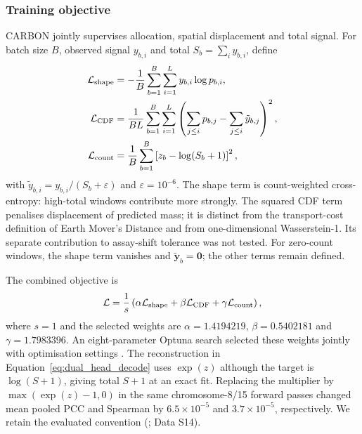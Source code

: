 \subsubsection{Training objective}\label{subsec:loss}

CARBON jointly supervises allocation, spatial displacement and total signal. For batch size $B$, observed signal $y_{b,i}$ and total $S_b=\sum_i y_{b,i}$, define
\begin{align}
\mathcal L_{\rm shape}
&=-\frac1B\sum_{b=1}^{B}\sum_{i=1}^{L}y_{b,i}\log p_{b,i},
\label{eq:shape_loss}\\
\mathcal L_{\rm CDF}
&=\frac1{BL}\sum_{b=1}^{B}\sum_{i=1}^{L}
\left(\sum_{j\leq i}p_{b,j}-\sum_{j\leq i}\tilde y_{b,j}\right)^2,
\label{eq:cdf_loss}\\
\mathcal L_{\rm count}
&=\frac1B\sum_{b=1}^{B}\left[z_b-\log(S_b+1)\right]^2,
\label{eq:main_count_loss}
\end{align}
with $\tilde y_{b,i}=y_{b,i}/(S_b+\varepsilon)$ and $\varepsilon=10^{-6}$. The shape term is count-weighted cross-entropy: high-total windows contribute more strongly. The squared CDF term penalises displacement of predicted mass; it is distinct from the transport-cost definition of Earth Mover's Distance \citep{rubner2000emd} and from one-dimensional Wasserstein-1. Its separate contribution to assay-shift tolerance was not tested. For zero-count windows, the shape term vanishes and $\tilde{\mathbf y}_b=\mathbf0$; the other terms remain defined.

The combined objective is
\begin{equation}
\mathcal L=\frac1s
\left(\alpha\mathcal L_{\rm shape}+
\beta\mathcal L_{\rm CDF}+\gamma\mathcal L_{\rm count}\right),
\label{eq:total_loss}
\end{equation}
where $s=1$ and the selected weights are $\alpha=1.4194219$, $\beta=0.5402181$ and $\gamma=1.7983396$. An eight-parameter Optuna search selected these weights jointly with optimisation settings \citep{akiba2019optuna}. The reconstruction in Equation~\ref{eq:dual_head_decode} uses $\exp(z)$ although the target is $\log(S+1)$, giving total $S+1$ at an exact fit. Replacing the multiplier by $\max(\exp(z)-1,0)$ in the same chromosome-8/15 forward passes changed mean pooled PCC and Spearman by $6.5\times10^{-5}$ and $3.7\times10^{-5}$, respectively. We retain the evaluated convention (; Data S14).

